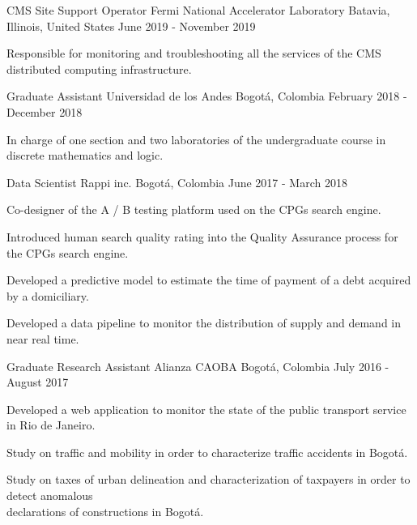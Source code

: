 \begin{cventries}
    \cventry
    {CMS Site Support Operator}
    {Fermi National Accelerator Laboratory}
    {Batavia, Illinois, United States}
    {June 2019 - November 2019}
    {
        \begin{cvitems}
        \item{Responsible for monitoring and troubleshooting all the services of the CMS distributed computing infrastructure.}
        \end{cvitems}
    }

    \cventry
    {Graduate Assistant}
    {Universidad de los Andes}
    {Bogotá, Colombia}
    {February 2018 - December 2018}
    {
        \begin{cvitems}
        \item{In charge of one section and two laboratories of the undergraduate course in discrete mathematics and logic.}
        \end{cvitems}
    }

    \cventry
    {Data Scientist} %
    {Rappi inc.} %
    {Bogotá, Colombia} %
    {June 2017 - March 2018} %
    {
        \begin{cvitems}
        \item{Co-designer of the A / B testing platform used on the CPGs search engine.}
        \item{Introduced human search quality rating into the Quality Assurance process for the CPGs search engine.}
        \item{Developed a predictive model to estimate the time of payment of a debt acquired by a domiciliary.}
        \item{Developed a data pipeline to monitor the distribution of supply and demand in near real time.}
        \end{cvitems}
    }


    \cventry
    {Graduate Research Assistant} %
    {Alianza CAOBA} %
    {Bogotá, Colombia} %
    {July 2016 - August 2017} %
    {
        \begin{cvitems}
        \item{Developed a web application to monitor the state of the public transport service in Rio de Janeiro.}
        \item{Study on traffic and mobility in order to characterize traffic accidents in Bogotá.}
        \item{Study on taxes of urban delineation and characterization of taxpayers in order to detect anomalous \\declarations of constructions in Bogotá.}
        \end{cvitems}
    }

\end{cventries}
